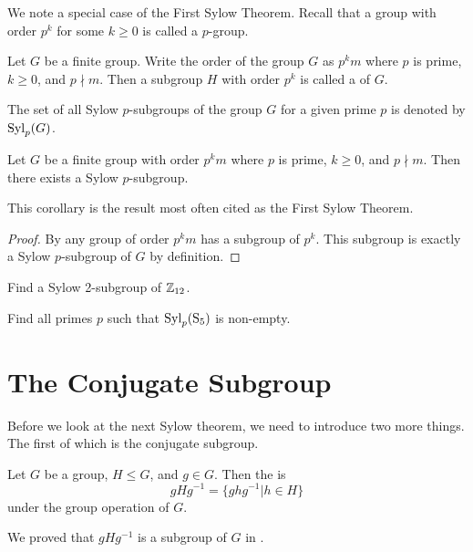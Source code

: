 We note a special case of the First Sylow Theorem. Recall that a group with order $p^k$ for some $k \geq 0$ is called a $p$-group.

\begin{definition}\label{definition-sylow-p-subgroup}
    Let $G$ be a finite group. Write the order of the group $G$ as $p^k m$ where $p$ is prime, $k \geq 0$, and $p \nmid m$. Then a subgroup $H$ with order $p^k$ is called a  of $G$.

    The set of all Sylow $p$-subgroups of the group $G$ for a given prime $p$ is denoted by $\mathrm{Syl}_{p}(G)$.
\end{definition}

\begin{corollary}\label{corollary-sylow-p-subgroup-exists}
    Let $G$ be a finite group with order $p^k m$ where $p$ is prime, $k \geq 0$, and $p \nmid m$. Then there exists a Sylow $p$-subgroup.
\end{corollary}
\begin{remark}
    This corollary is the result most often cited as the First Sylow Theorem.
\end{remark}
\begin{proof}
    By  any group of order $p^km$ has a subgroup of $p^k$. This subgroup is exactly a Sylow $p$-subgroup of $G$ by definition.
\end{proof}

\begin{exercise}
    Find a Sylow 2-subgroup of $\mathbb{Z}_{12}$.
\end{exercise}

\begin{exercise}
    Find all primes $p$ such that $\mathrm{Syl}_{p}(\mathrm{S}_{5})$ is non-empty.
\end{exercise}

\section{The Conjugate Subgroup}
Before we look at the next Sylow theorem, we need to introduce two more things. The first of which is the conjugate subgroup.

\begin{definition}
    Let $G$ be a group, $H \leq G$, and $g \in G$. Then the  is
    \[
        gHg^{-1} = \{ghg^{-1} \vert h \in H\}
    \]
    under the group operation of $G$.
\end{definition}
We proved that $gHg^{-1}$ is a subgroup of $G$ in .

